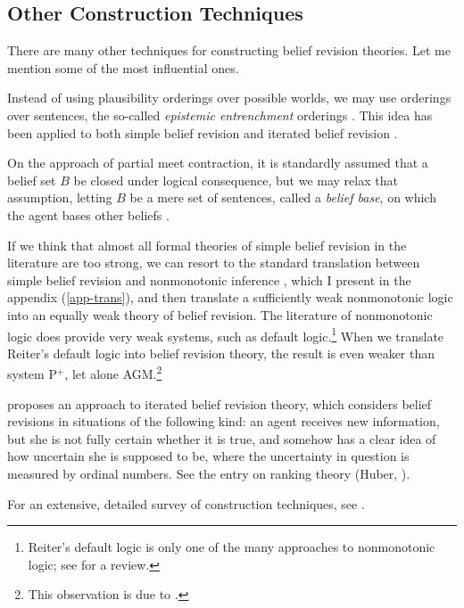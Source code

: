 \subsection{Other Construction Techniques}\label{sec-other}

There are many other techniques for constructing belief revision theories. Let me mention some of the most influential ones.\op

	\im Instead of using plausibility orderings over possible worlds, we may use orderings over sentences, the so-called {\em epistemic entrenchment} orderings \citep{gardenfors1988revisions}. This idea has been applied to both simple belief revision and iterated belief revision \citep{nayak1994iterated}. 

	\im On the approach of partial meet contraction, it is standardly assumed that a belief set $B$ be closed under logical consequence, but we may relax that assumption, letting $B$ be a mere set of sentences, called a {\em belief base}, on which the agent bases other beliefs \citep{hansson1994taking,hansson1999textbook}. 

	\im If we think that almost all formal theories of simple belief revision in the literature are too strong, we can resort to the standard translation between simple belief revision and nonmonotonic inference \citep*{makinson1991relations}, which I present in the appendix (\autoref{app-trans}), and then translate a sufficiently weak nonmonotonic logic into an equally weak theory of belief revision. The literature of nonmonotonic logic does provide very weak systems, such as  default logic.\footnote
		{
		Reiter's default logic is only one of the many approaches to nonmonotonic logic; see \citet*{brewka2008nonmonotonic} for a review.
		}
	When we translate Reiter's default logic into belief revision theory, the result is even weaker than system P$^+$, let alone AGM.\footnote
		{
		This observation is due to \citet{makinson1988general}.
		}

	\im \citet{spohn1988ordinal} proposes an approach to iterated belief revision theory, which considers belief revisions in situations of the following kind: an agent receives new information, but she is not fully certain whether it is true, and somehow has a clear idea of how uncertain she is supposed to be, where the uncertainty in question is measured by ordinal numbers. See the entry on ranking theory (Huber, ).

\ed For an extensive, detailed survey of construction techniques, see \citet*{rodrigues2011belief}.



